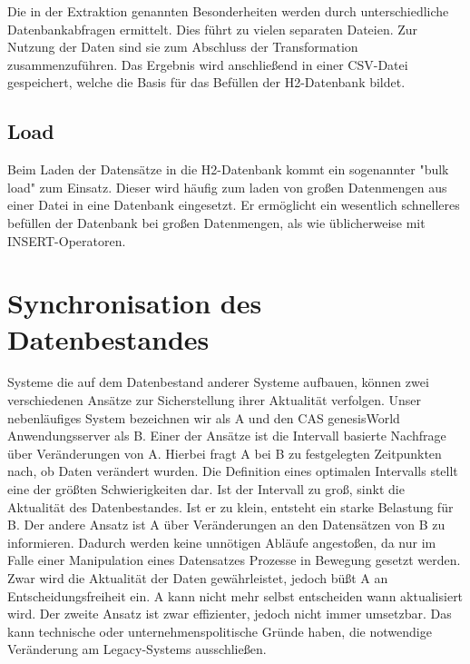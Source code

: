 Die in der Extraktion genannten Besonderheiten werden durch unterschiedliche Datenbankabfragen ermittelt. Dies führt zu vielen separaten Dateien. Zur Nutzung der Daten sind sie zum Abschluss der Transformation zusammenzuführen. Das Ergebnis wird anschließend in einer CSV-Datei gespeichert, welche die Basis für das Befüllen der H2-Datenbank bildet. 

\subsection{Load}

Beim Laden der Datensätze in die H2-Datenbank kommt ein sogenannter "bulk load" zum Einsatz. Dieser wird häufig zum laden von großen Datenmengen aus einer Datei in eine Datenbank eingesetzt. Er ermöglicht ein wesentlich schnelleres befüllen der Datenbank bei großen Datenmengen, als wie üblicherweise mit INSERT-Operatoren.

\section{Synchronisation des Datenbestandes}
\label{ch:Konzeption:sec:updatedatenbestand}

Systeme die auf dem Datenbestand anderer Systeme aufbauen, können zwei verschiedenen Ansätze zur Sicherstellung ihrer Aktualität verfolgen. Unser nebenläufiges System bezeichnen wir als A und den CAS genesisWorld Anwendungsserver als B. Einer der Ansätze ist die Intervall basierte Nachfrage über Veränderungen von A. Hierbei fragt A bei B zu festgelegten Zeitpunkten nach, ob Daten verändert wurden. Die Definition eines optimalen Intervalls stellt eine der größten Schwierigkeiten dar. Ist der Intervall zu groß, sinkt die Aktualität des Datenbestandes. Ist er zu klein, entsteht  ein starke Belastung für B. Der andere Ansatz ist A über Veränderungen an den Datensätzen von B zu informieren. Dadurch werden keine unnötigen Abläufe angestoßen, da nur im Falle einer Manipulation eines Datensatzes Prozesse in Bewegung gesetzt werden. Zwar wird die Aktualität der Daten gewährleistet, jedoch büßt A an Entscheidungsfreiheit ein. A kann nicht mehr selbst entscheiden wann aktualisiert wird. Der zweite Ansatz ist zwar effizienter, jedoch nicht immer umsetzbar. Das kann technische oder unternehmenspolitische Gründe haben, die notwendige Veränderung am Legacy-Systems ausschließen.  

